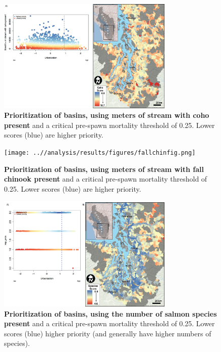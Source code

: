 \documentclass{article}
\begin{document}
\begin{figure}[h!]
\centering
\noindent \includegraphics[width=0.75\textwidth]{..//analysis/results/figures/cohopresfig.png}
\caption{\textbf{Prioritization of basins, using meters of stream with coho present} and a critical pre-spawn mortality threshold of 0.25. Lower scores (blue) are higher priority. }
\label{fig:coho}
\end{figure}

\begin{figure}[h!]
\centering
\noindent \texttt{[image: ..//analysis/results/figures/fallchinfig.png]}
\caption{\textbf{Prioritization of basins, using meters of stream with fall chinook present} and a critical pre-spawn mortality threshold of 0.25. Lower scores (blue) are higher priority. }
\label{fig:chin}
\end{figure}

\begin{figure}[h!]
\centering
\noindent \includegraphics[width=0.75\textwidth]{..//analysis/results/figures/salmsppfig.png}
\caption{\textbf{Prioritization of basins, using the number of salmon species present} and a critical pre-spawn mortality threshold of 0.25. Lower scores (blue) higher priority (and generally have higher numbers of species). }
\label{fig:spp}
\end{figure}
\end{document}
